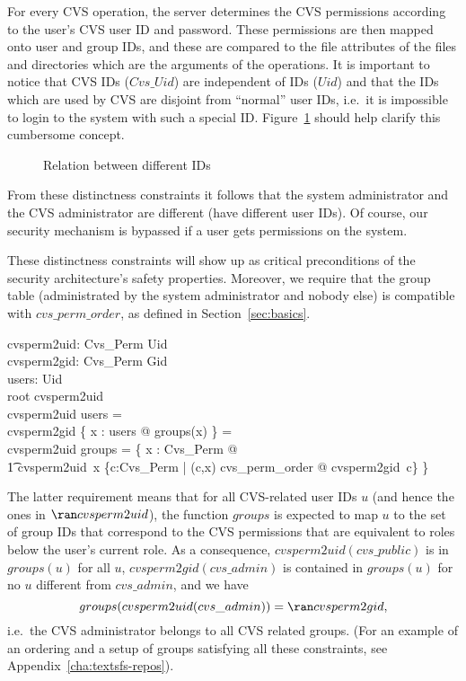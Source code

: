 For every CVS operation, the server determines the CVS permissions according to
the user's CVS user ID and password.  These permissions are then mapped onto
\unix{} user and group IDs, and these are compared to the file attributes of the
files and directories which are the arguments of the operations.  It is
important to notice that CVS IDs ($Cvs\_Uid$) are independent of \unix{} IDs
($Uid$) and that the \unix{} IDs which are used by CVS are disjoint from
``normal'' \unix{} user IDs, i.e.\  it is impossible to login to the \unix{}
system with such a special \unix{} ID\@.  Figure~\ref{fig:ids} should help clarify
this cumbersome concept.
\begin{figure}
    \centering
    \caption{Relation between different IDs}
    \label{fig:ids}
\end{figure}
From these distinctness constraints it follows that the \unix{} system
administrator and the CVS administrator are different (have different user IDs).
Of course, our security mechanism is bypassed if a user gets 
permissions on the \unix{} system.

These distinctness constraints will show up as critical preconditions of the
security architecture's safety properties.  Moreover, we require that the group
table (administrated by the system administrator and nobody else) is compatible
with $cvs\_perm\_order$, as defined in Section~\ref{sec:basics}.
\begin{doc}{5}
  \begin{axdef}
    cvsperm2uid: Cvs\_Perm \inj Uid \\
    cvsperm2gid: Cvs\_Perm \inj Gid \\
    users: \power Uid \\
    \where
    root \notin \ran cvsperm2uid \\
    \ran cvsperm2uid \cap users = \emptyset \\
    \ran cvsperm2gid \cap \bigcup \{ x : users @ groups(x) \} = \emptyset \\
    \ran cvsperm2uid \dres groups = \{ x : Cvs\_Perm @ \\
    \t1 cvsperm2uid~x \mapsto \{c:Cvs\_Perm | (c,x) \in cvs\_perm\_order @
    cvsperm2gid~c\} \}
  \end{axdef}
\end{doc}
The latter requirement means that for all CVS-related user IDs $u$
(and hence the ones in $\ran cvsperm2uid$), the function $groups$ is expected to map $u$ to the
set of group IDs that correspond to the CVS permissions that are equivalent to
roles below the user's current role.  As a consequence,
$cvsperm2uid(cvs\_public)$ is in $groups(u)$ for all $u$,
$cvsperm2gid(cvs\_admin)$ is contained in $groups(u)$ for no $u$ different from
$cvs\_admin$, and we have
\[ groups(cvsperm2uid(cvs\_admin)) = \ran cvsperm2gid, \]
i.e.\ the CVS administrator belongs to all CVS related groups. (For an example
of an ordering and a setup of groups satisfying all these constraints, see
Appendix~\ref{cha:textsfs-repos}).
  
